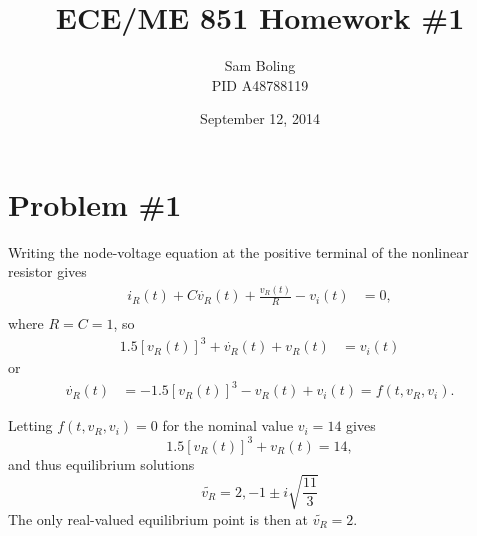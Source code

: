 \documentclass{article}
\title{ECE/ME 851 Homework \#1}
\date{September 12, 2014}
\author{Sam Boling \\ PID A48788119}
\begin{document}
\maketitle

\section*{Problem \#1}

Writing the node-voltage equation at the positive terminal of the
nonlinear resistor gives
\begin{align*}
i_R(t) + C\dot{v_R}(t) + \frac{v_R(t)}{R} - v_i(t) & = 0, \\
\end{align*}
where $R = C = 1$, so
\begin{align*}
1.5[v_R(t)]^3 + \dot{v_R}(t) + v_R(t) & = v_i(t)
\end{align*}
or
\begin{align*}
\dot{v_R}(t) & = -1.5 [v_R(t)]^3 - v_R(t) + v_i(t) = f(t, v_R, v_i).
\end{align*}

Letting $f(t, v_R, v_i) = 0$ for the nominal value $v_i = 14$ gives
$$
1.5[v_R(t)]^3 + v_R(t) = 14,
$$
and thus equilibrium solutions 
$$\tilde{v_R} = 2, -1 \pm i \sqrt{\frac{11}{3}}$$
The only real-valued equilibrium point is then at $\tilde{v_R} = 2$.
\end{document}
